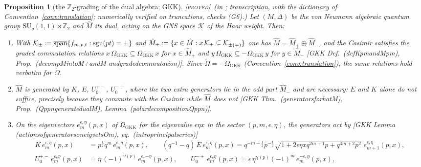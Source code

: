 \documentclass[11pt,a4paper]{article}
\providecommand{\coloneqq}{\mathrel{\vcenter{\baselineskip0.5ex \lineskiplimit0pt
      \hbox{\scriptsize.}\hbox{\scriptsize.}}}=}
\newcommand{\PROVED}{{\color{ForestGreen}\textsc{[proved]}}}
\theoremstyle{definition}
\theoremstyle{plain}
\newtheorem{proposition}[definition]{Proposition}
\newcommand{\SUq}{\mathrm{SU}_q(1,1)}
\newcommand{\tCas}{\tilde\Omega}                %
\newcommand{\Z}{\mathbb{Z}}
\begin{document}
\begin{proposition}[the $\Z_2$-grading of the dual algebra; GKK]\label{prop:gkkgrading}
\PROVED\ (in \cite{Groenevelt:2009gkk}; transcription, with the dictionary of
Convention~\ref{conv:translation}; numerically verified on truncations, checks (G6).)
Let $(M,\Delta)$ be the von Neumann algebraic quantum group $\SUq\rtimes\Z_2$ and $\hat M$ its
dual, acting on the GNS space $\mathcal{K}$ of the Haar weight. Then:
\begin{enumerate}[label=(\roman*)]
\item With $\mathcal{K}_{\pm}\coloneqq\overline{\mathrm{span}}\{f_{m,p,t}:\operatorname{sgn}(pt)
=\pm\}$ and $\hat M_{\pm}\coloneqq\{x\in\hat M: x\,\mathcal{K}_{\pm}\subseteq
\mathcal{K}_{\pm(\mp)}\}$ one has $\hat M=\hat M_{+}\oplus\hat M_{-}$, and the Casimir
satisfies the graded commutation relations $x\,\Omega_{\mathrm{GKK}}\subseteq
\Omega_{\mathrm{GKK}}\,x$ for $x\in\hat M_{+}$ and $y\,\Omega_{\mathrm{GKK}}\subseteq
-\Omega_{\mathrm{GKK}}\,y$ for $y\in\hat M_{-}$ [GKK Def.\ (defKpmandMpm), Prop.\
(decompMintoM+andM-andgradedcommutation)]. Since $\tCas=-\Omega_{\mathrm{GKK}}$
(Convention~\ref{conv:translation}), the same relations hold verbatim for $\tCas$.
\item $\hat M$ is generated by $K$, $E$, $U^{+-}_{0}$, $U^{-+}_{0}$, where the two extra
generators lie in the odd part $\hat M_{-}$ and are \emph{necessary}: $E$ and $K$ alone
do not suffice, precisely because they commute with the Casimir while $\hat M$ does not
[GKK Thm.\ (generatorsforhatM), Prop.\ (QppngeneratedualM), Lemma\
(polardecompositionQppn)].
\item On the eigenvectors $e^{\epsilon,\eta}_{m}(p,x)$ of $\Omega_{\mathrm{GKK}}$ for the
eigenvalue $\epsilon\eta x$ in the sector $(p,m,\epsilon,\eta)$, the generators act by
[GKK Lemma (actionsofgeneratorsoneigvetsOm), eq.\ (introprincipalseries)]
\begin{equation}\label{eq:gkkgradingaction}
\begin{split}
  K\,e^{\epsilon,\eta}_{m}(p,x)&=p^{\frac12}q^{m}\,e^{\epsilon,\eta}_{m}(p,x),\qquad
  (q^{-1}-q)\,E\,e^{\epsilon,\eta}_{m}(p,x)=q^{-m-\frac12}p^{-\frac12}
  \sqrt{1+2\epsilon\eta xq^{2m+1}p+q^{4m+2}p^{2}}\;e^{\epsilon,\eta}_{m+1}(p,x),\\
  U^{+-}_{0}\,e^{\epsilon,\eta}_{m}(p,x)&=\eta\,(-1)^{\upsilon(p)}\,
  e^{\epsilon,-\eta}_{m}(p,x),\qquad
  U^{-+}_{0}\,e^{\epsilon,\eta}_{m}(p,x)=\epsilon\,\eta^{\chi(p)}(-1)^{m}\,
  e^{-\epsilon,\eta}_{m}(p,x),
\end{split}

\end{equation}
\end{enumerate}
\end{proposition}
\end{document}
